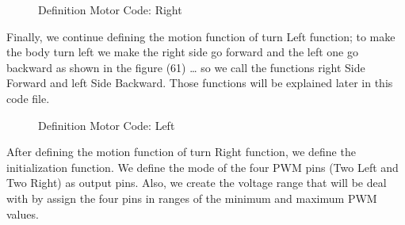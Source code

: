 \documentclass{article}
\begin{document}
\begin{figure}[h]
  \centering
  \hfill
  \caption{Definition Motor Code: Right}
\end{figure}

Finally, we continue defining the motion function of turn Left function; to make the body turn left we make the right side go forward and the left one go backward as shown in the figure (61) … so we call the functions right Side Forward and left Side Backward. Those functions will be explained later in this code file.

\begin{figure}[h]
  \centering
  \hfill
  \caption{Definition Motor Code: Left}
\end{figure}


After defining the motion function of turn Right function, we define the initialization function. We define the mode of the four PWM pins (Two Left and Two Right) as output pins. Also, we create the voltage range that will be deal with by assign the four pins in ranges of the minimum and maximum PWM values.
\end{document}
